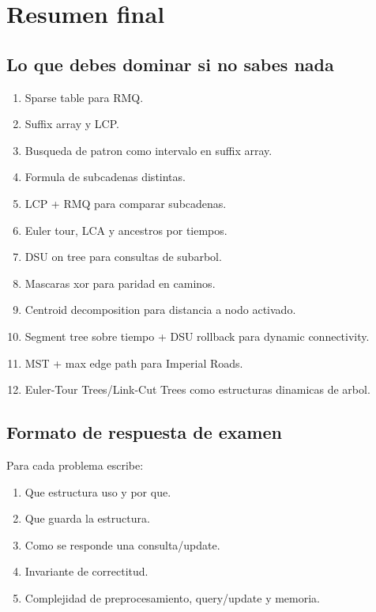 \documentclass[10pt]{article}
\begin{document}
\clearpage
\section{Resumen final}

\subsection*{Lo que debes dominar si no sabes nada}
\begin{enumerate}[leftmargin=*]
\item Sparse table para RMQ.
\item Suffix array y LCP.
\item Busqueda de patron como intervalo en suffix array.
\item Formula de subcadenas distintas.
\item LCP + RMQ para comparar subcadenas.
\item Euler tour, LCA y ancestros por tiempos.
\item DSU on tree para consultas de subarbol.
\item Mascaras xor para paridad en caminos.
\item Centroid decomposition para distancia a nodo activado.
\item Segment tree sobre tiempo + DSU rollback para dynamic connectivity.
\item MST + max edge path para Imperial Roads.
\item Euler-Tour Trees/Link-Cut Trees como estructuras dinamicas de arbol.
\end{enumerate}

\subsection*{Formato de respuesta de examen}
Para cada problema escribe:
\begin{enumerate}[leftmargin=*]
\item Que estructura uso y por que.
\item Que guarda la estructura.
\item Como se responde una consulta/update.
\item Invariante de correctitud.
\item Complejidad de preprocesamiento, query/update y memoria.
\end{enumerate}
\end{document}
